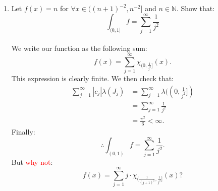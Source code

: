 \begin{enumerate}
    \begin{proof}
        From part ($a$) we have that $\forall\epsilon:0<\epsilon<M/2$:
        $$(M-\epsilon)^p(\beta-\alpha)\leq\int_{a}^{b}|f(x)|^p dx\leq M^p(b-a)$$
        where $a<\alpha<\beta<b$. Taking the $p$th root gives:
        $$(M-\epsilon)(\beta-\alpha)^{1/p}\leq\left(\int_{a}^{b}|f(x)|^p dx\right)^{1/p}\leq M(b-a)^{1/p}.$$
        Now by definition $\beta-\alpha>0$ and $b-a>0$. So taking $p\rightarrow\infty$:
        $$M-\epsilon\leq\left(\int_{a}^{b}|f(x)|^p dx\right)^{1/p}\leq M<M+\epsilon$$
        for all $0<\epsilon<M/2$, by monotone convergence theorem. Then:
        $$|\left(\int_{a}^{b}|f(x)|^p dx\right)^{1/p}-M|<\epsilon,$$
        or that
        $$\lim_{p\rightarrow\infty}\left(\int_{a}^{b}|f(x)|^p dx\right)^{1/p}=M.$$
    \end{proof}

    \newpage

    \item Let $f(x)=n$ for $\forall x\in((n+1)^{-2},n^{-2}]$ and $n\in\mathbb{N}$. Show that:
    $$\int_{(0,1]}f=\sum_{j=1}^{\infty}\frac{1}{j^2}$$ \\

    We write our function as the following sum:
    $$f(x)=\sum_{j=1}^{\infty}\chi_{(0,\frac{1}{j^2}]}(x).$$
    This expression is clearly finite. We then check that:
    \begin{align*}
        \sum_{j=1}^{\infty}|c_j|\lambda(J_j)
        &=\sum_{j=1}^{\infty}\lambda((0,\frac{1}{j^2}]) \\
        &=\sum_{j=1}^{\infty}\frac{1}{j^2} \\
        &=\frac{\pi^2}{6}<\infty.
    \end{align*}
    Finally:
    $$\therefore\int_{(0,1)}f=\sum_{j=1}^{\infty}\frac{1}{j^2}.$$
    But \textcolor{red}{why not}:
    $$f(x)=\sum_{j=1}^{\infty}j\cdot\chi_{(\frac{1}{(j+1)^2},\frac{1}{j^2}]}(x)?$$
\end{enumerate}